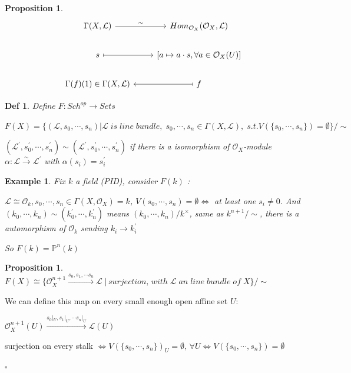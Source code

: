 \documentclass{article}
\newtheorem{definition}[theorem]{Def}
\newtheorem{example}[theorem]{Example}
\newtheorem{proposition}[theorem]{Proposition}
\newenvironment{Proof}{{\noindent \indent \it Proof:\quad}}{\hfill $\square$\par}
\begin{document}
\begin{proposition}
\[\begin{tikzcd}	{\Gamma(X,\mathcal L)} & {Hom_{\mathcal O_X}(\mathcal O_X,\mathcal L)} \\
	s & {[a\mapsto a\cdot s, \forall a\in\mathcal O_X(U)]} \\
	{\Gamma(f)(1)\in\Gamma(X,\mathcal L)} & f
	\arrow["\sim", from=1-1, to=1-2]
	\arrow[maps to, from=2-1, to=2-2]
	\arrow[maps to, from=3-2, to=3-1]
\end{tikzcd}\]
\label{prop 3.72}
\end{proposition}

\begin{definition}
    Define $F:Sch^{op}\to Sets$

    $F(X)=\{(\mathcal L,s_0,\cdots,s_n)|\mathcal L\;is\;line\;bundle,\;s_0,\cdots,s_n\in\Gamma(X,\mathcal L),\;s.t.V(\{s_0,\cdots,s_n\})=\emptyset\}/\sim$

    $(\mathcal L^\prime,s_0^\prime,\cdots,s_n^\prime)
    \sim
    (\mathcal L^\prime,s_0^\prime,\cdots,s_n^\prime)$ if there is a isomorphism of $\mathcal O_X$-module $\alpha:\mathcal L\xrightarrow{\sim}\mathcal L^\prime$ with $\alpha(s_i)=s_i^\prime$
\end{definition}

\begin{example}
    Fix $k$ a field (PID), consider $F(k)$ :

    $\mathcal L\cong\mathcal O_k,s_0,\cdots,s_n\in\Gamma(X,\mathcal O_X)=k$, $V(s_0,\cdots,s_n)=\emptyset\Leftrightarrow$ at least one $s_i\ne 0$. And $(k_0,\cdots,k_n)
    \sim
    (k_0^\prime,\cdots,k_n^\prime)$ means $(k_0,\cdots,k_n)/k^\times$, same as $k^{n+1}/\sim$, there is a automorphism of $\mathcal O_k$ sending $k_i\to k_i^\prime$

    So $F(k)=\mathbb P^n(k)$
\end{example}

\begin{proposition}
    $F(X) \cong \{\mathcal O^{n+1}_X \xrightarrow{s_0,s_1,\cdots s_n} \mathcal L \;| \,surjection,\, with\; \mathcal L\; an\; line\; bundle\;of\;X\} /\sim$
\end{proposition}
\begin{Proof}
    We can define this map on every small enough open affine set $U$:
    
    $\mathcal O_X^{n+1}(U)\xrightarrow{s_0|_U,s_1|_U,\cdots s_n|_U} 
    \mathcal L(U)$
    
    surjection on every stalk $\Leftrightarrow
    V(\{s_0,\cdots,s_n\})_U=\emptyset,\,\forall U
    \Leftrightarrow
    V(\{s_0,\cdots,s_n\})=\emptyset$
    
\end{Proof}
\end{document}
